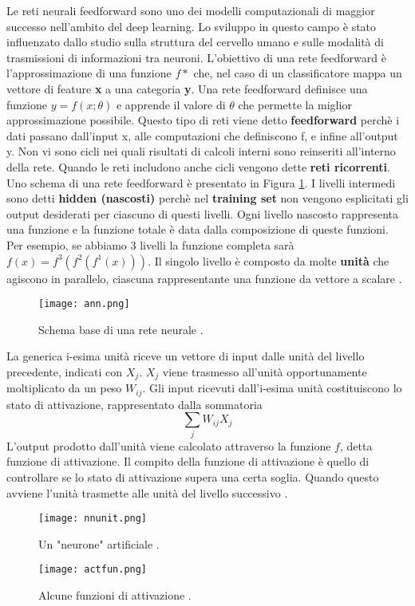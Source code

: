 Le reti neurali feedforward sono uno dei modelli computazionali di maggior successo nell'ambito del deep learning. Lo sviluppo in questo campo è stato influenzato  dallo
studio sulla struttura del cervello umano e sulle modalità di trasmissioni di informazioni tra neuroni. L'obiettivo di una rete feedforward  è l'approssimazione di una funzione $f*$ che, nel caso di un classificatore mappa
un vettore di feature \textbf{x} a una categoria \textbf{y}. Una rete feedforward definisce una funzione $y=f(x;\theta)$ e apprende il valore di $\theta$ che permette
la miglior approssimazione possibile. Questo tipo di reti viene detto \textbf{feedforward} perchè i dati passano dall'input x, alle computazioni che definiscono f, e infine all'output y. Non vi sono cicli 
nei quali risultati di calcoli interni sono reinseriti all'interno della rete. Quando le reti includono anche cicli vengono dette \textbf{reti ricorrenti}.
Uno schema di una rete feedforward  è presentato in Figura \ref{fig:ann}. I livelli intermedi sono detti \textbf{hidden (nascosti)} perchè nel \textbf{training set} non vengono esplicitati
gli output desiderati  per ciascuno di questi livelli. Ogni livello nascosto rappresenta una funzione e la funzione totale è data dalla composizione di queste funzioni. Per esempio,
se abbiamo 3 livelli la funzione completa sarà $f(x) = f^{3}(f^{2}(f^{1}(x)))$. Il singolo livello è composto da molte \textbf{unità} che agiscono in parallelo, ciascuna rappresentante una funzione da vettore a scalare \cite{bengio}.
\begin{figure}
  \texttt{[image: ann.png]}
  \caption{Schema base di una rete neurale \cite{ann}.}
  \label{fig:ann}
\end{figure}

La generica i-esima unità  riceve un vettore di input dalle unità del livello precedente, indicati con $X_j$. $X_j$ viene trasmesso all'unità opportunamente moltiplicato da un peso $W_{ij}$.
Gli input ricevuti dall'i-esima unità costituiscono lo stato di attivazione, rappresentato dalla sommatoria \[\sum_jW_{ij}X_j\] L'output prodotto dall'unità viene calcolato attraverso la funzione $f$, detta funzione di attivazione. Il compito della funzione di attivazione è quello di controllare
se lo stato di attivazione supera una certa soglia. Quando questo avviene l'unità trasmette alle unità del livello successivo \cite{mazzetti}.
\begin{figure}
  \texttt{[image: nnunit.png]}
  \caption{Un "neurone" artificiale \cite{unit}.}
  \label{fig::unit}
\end{figure}
\begin{figure}
  \texttt{[image: actfun.png]}
  \caption{Alcune funzioni di attivazione \cite{act}.}
  \label{fig:act}
\end{figure}

